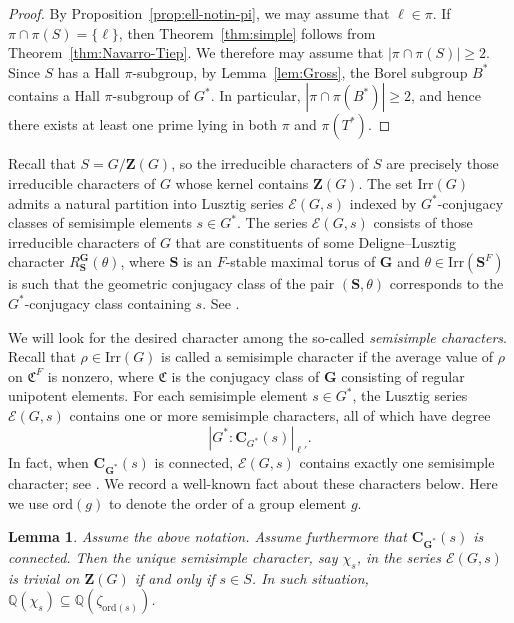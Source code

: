 \documentclass[12pt]{amsart}
\newtheorem{lemma}[theorem]{Lemma}
\theoremstyle{definition}
\numberwithin{equation}{section}
\newcommand{\Irr}{{\mathrm {Irr}}}
\newcommand{\ord}{{\mathrm {ord}}}
\newcommand{\QQ}{{\mathbb Q}}
\newcommand{\EC}{\mathcal{E}}
\newcommand{\bC}{{\mathbf{C}}}
\newcommand{\bG}{{\mathbf{G}}}
\newcommand{\bS}{{\mathbf{S}}}
\newcommand{\bZ}{{\mathbf{Z}}}
\begin{document}
\begin{proof}
By Proposition~\ref{prop:ell-notin-pi}, we may assume that
$\ell\in\pi$. If $\pi\cap \pi(S)=\{\ell\}$, then
Theorem~\ref{thm:simple} follows from
Theorem~\ref{thm:Navarro-Tiep}. We therefore may assume that
$|\pi\cap \pi(S)|\geq 2$. Since $S$ has a Hall $\pi$-subgroup, by
Lemma~\ref{lem:Gross}, the Borel subgroup $B^*$ contains a Hall
$\pi$-subgroup of $G^*$. In particular, $|\pi\cap \pi(B^*)|\geq 2$,
and hence there exists at least one prime lying in both $\pi$ and
$\pi(T^*)$.
\end{proof}



Recall that $S=G/\bZ(G)$, so the irreducible characters of $S$ are
precisely those irreducible characters of $G$ whose kernel contains
$\bZ(G)$. The set $\Irr(G)$ admits a natural partition into Lusztig
series $\EC(G,s)$ indexed by $G^\ast$-conjugacy classes of
semisimple elements $s\in G^\ast$. The series $\EC(G,s)$ consists of
those irreducible characters of $G$ that are constituents of some
Deligne--Lusztig character $R_{\bS}^{\bG}(\theta)$, where $\bS$ is
an $F$-stable maximal torus of $\bG$ and $\theta\in\Irr(\bS^F)$ is
such that the geometric conjugacy class of the pair $(\bS,\theta)$
corresponds to the $G^\ast$-conjugacy class containing $s$. See
\cite[\S2.6]{GeckMalle}.

We will look for the desired character among the so-called
\emph{semisimple characters}. Recall that \(\rho \in \Irr(G)\) is
called a semisimple character if the average value of \(\rho\) on
\(\mathfrak{C}^F\) is nonzero, where \(\mathfrak{C}\) is the
conjugacy class of \(\bG\) consisting of regular unipotent elements.
For each semisimple element \(s \in G^*\), the Lusztig series
\(\EC(G,s)\) contains one or more semisimple characters, all of
which have %
degree
\[
|G^* : \bC_{G^*}(s)|_{\ell'}.
\]
In %
fact, when \(\bC_{\bG^*}(s)\) is connected, \(\EC(G,s)\) contains
exactly one semisimple character; see \cite[p.~171]{GeckMalle}. We
record a well-known fact about these characters below. Here we use
$\ord(g)$ to denote the order of a group element $g$.

\begin{lemma}\label{lem:1}
Assume the above notation. Assume furthermore that $\bC_{\bG^*}(s)$
is connected. Then the unique semisimple character, say $\chi_s$, in
the series \(\EC(G,s)\) is trivial on $\bZ(G)$ if and only if $s\in
S$. In such situation, $\QQ(\chi_s)\subseteq \QQ(\zeta_{\ord(s)})$.
\end{lemma}
\end{document}
